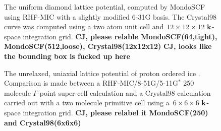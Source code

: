 \documentclass[prb,aps,nobibnotes,twocolumn,doublespace,twocolumngrid,superbib]{revtex4}
\begin{document}
\begin{figure}[h]
\caption{The uniform diamond lattice potential, computed by {\sc MondoSCF} using 
RHF-MIC with a slightly modified 6-31G basis.  The {\sc Crystal98} curve was computed
using a two atom unit cell and $12 \times 12 \times 12~{\bf k}$-space integration grid.
{\bf CJ, please relable MondoSCF(64,tight), MondoSCF(512,loose), Crystal98(12x12x12)}
{\bf CJ, looks like the bounding box is fucked up here}
}
\label{DiamondLattice}
\end{figure}


\begin{figure}
\caption{The unrelaxed, uniaxial lattice potential of proton ordered ice \cite{}.
Comparison is made between a RHF-MIC/8-51G/5-11G$^*$ 250 molecule $\Gamma$-point super-cell 
calculation and a {\sc Crystal98} calculation carried out with a two molecule primitive
cell using a~$6\times6\times6$ $\bf k$-space integration grid.
{\bf CJ, please relabel it MondoSCF(250) and Crystal98(6x6x6)} }
\label{IceEnergyVsLattice}
\end{figure}
\end{document}
